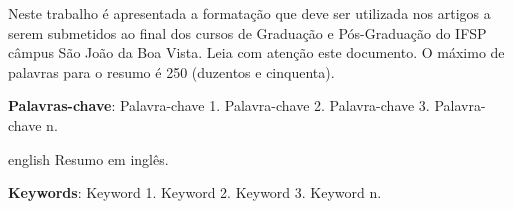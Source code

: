 \documentclass[
	article,
	11pt,
	oneside,
	a4paper,
	chapter=TITLE,
	section=TITLE,
	english,
	brazil,
	sumario=tradicional
]{abntex2}
\begin{document}
	
	
	\frenchspacing 
	
	
    
	\maketitle
    
	\begin{resumoumacoluna}
		
		Neste trabalho é apresentada a formatação que deve ser utilizada nos artigos a serem submetidos ao final dos cursos de Graduação e Pós-Graduação do IFSP câmpus São João da Boa Vista. Leia com atenção este documento. O máximo de palavras para o resumo é 250 (duzentos e cinquenta). 
		
		\vspace{\onelineskip}
		
		\noindent
		\textbf{Palavras-chave}: Palavra-chave 1. Palavra-chave 2. Palavra-chave 3. Palavra-chave n.
		
	\end{resumoumacoluna}
	
    \renewcommand{\resumoname}{Abstract}
    \begin{resumoumacoluna}
    	
        \begin{otherlanguage*}{english}
   	    	Resumo em inglês.
   		
       		\vspace{\onelineskip}
   		
   	    	\noindent
   		   \textbf{Keywords}: Keyword 1. Keyword 2. Keyword 3. Keyword n.
   		   
      \end{otherlanguage*} 
  
   	\end{resumoumacoluna}
        
	
	\textual
	
\end{document}
